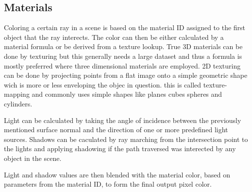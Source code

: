 			\subsection{Materials}
				Coloring a certain ray in a scene is based on the material ID
				assigned to the first object that the ray interects. The color
				can then be either calculated by a material formula or be 
				derived from a texture lookup. True 3D materials can be done by
				texturing but this generally needs a large dataset and thus a 
				formula is mostly preferred where three dimensional materials 
				are employed. 2D texturing can be done by projecting points from
				a flat image onto a simple geometric shape  wich is more or less 
				enveloping the objec in question. this is called texture-mapping 
				and commonly uses simple shapes like planes cubes spheres and 
				cylinders. 
				
				Light can be calculated by taking the angle of incidence between
				the previously mentioned surface normal and the direction of one 
				or more predefined light sources. Shadows can be caculated by 
				ray marching from the intersection point to the lights and 
				applying shadowing if the path traversed was interected by any
				object in the scene. 
				
				Light and shadow values are then blended with the material color,
				based on parameters from the material ID, to form the final 
				output pixel color.
						
		

